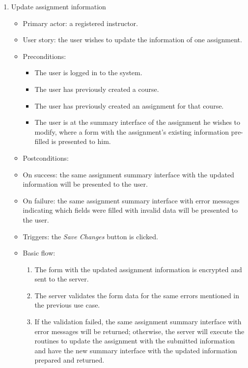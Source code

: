 \begin{enumerate}
\item Update assignment information
\begin{itemize}
    \item Primary actor: a registered instructor.
    \item User story: the user wishes to update the information of one
        assignment.
    \item Preconditions:
        \begin{itemize}
            \item The user is logged in to the system.
            \item The user has previously created a course.
            \item The user has previously created an assignment for that course.
            \item The user is at the summary interface of the assignment he
                wishes to modify, where a form with the assignment's existing
                information pre-filled is presented to him.
        \end{itemize}
    \item Postconditions:
        \item On success: the same assignment summary interface with the updated
            information will be presented to the user.
        \item On failure: the same assignment summary interface with error
            messages indicating which fields were filled with invalid data will
            be presented to the user.
    \item Triggers: the \emph{Save Changes} button is clicked.
    \item Basic flow:
        \begin{enumerate}
            \item The form with the updated assignment information is encrypted
                and sent to the server.
            \item The server validates the form data for the same errors
                mentioned in the previous use case.
            \item If the validation failed, the same assignment summary interface
                with error messages will be returned; otherwise, the server will
                execute the routines to update the assignment with the submitted
                information and have the new summary interface with the updated
                information prepared and returned.
        \end{enumerate}
\end{itemize}


\end{enumerate}
